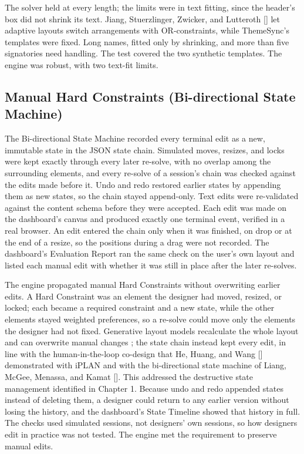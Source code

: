 \begin{refsection}
The solver held at every length; the limits were in text fitting, since the header's box did not shrink its text. Jiang, Stuerzlinger, Zwicker, and Lutteroth [\citeyear{Jiang2020ORCSolver}] let adaptive layouts switch arrangements with OR-constraints, while ThemeSync's templates were fixed. Long names, fitted only by shrinking, and more than five signatories need handling. The test covered the two synthetic templates. The engine was robust, with two text-fit limits.

\clearpage
\subsection{Manual Hard Constraints (Bi-directional State Machine)}

The Bi-directional State Machine recorded every terminal edit as a new, immutable state in the JSON state chain. Simulated moves, resizes, and locks were kept exactly through every later re-solve, with no overlap among the surrounding elements, and every re-solve of a session's chain was checked against the edits made before it. Undo and redo restored earlier states by appending them as new states, so the chain stayed append-only. Text edits were re-validated against the content schema before they were accepted. Each edit was made on the dashboard's canvas and produced exactly one terminal event, verified in a real browser. An edit entered the chain only when it was finished, on drop or at the end of a resize, so the positions during a drag were not recorded. The dashboard's Evaluation Report ran the same check on the user's own layout and listed each manual edit with whether it was still in place after the later re-solves.

The engine propagated manual Hard Constraints without overwriting earlier edits. A Hard Constraint was an element the designer had moved, resized, or locked; each became a required constraint and a new state, while the other elements stayed weighted preferences, so a re-solve could move only the elements the designer had not fixed. Generative layout models recalculate the whole layout and can overwrite manual changes \cite{Shi2023Survey}; the state chain instead kept every edit, in line with the human-in-the-loop co-design that He, Huang, and Wang [\citeyear{He2022iPLAN}] demonstrated with iPLAN and with the bi-directional state machine of Liang, McGee, Menassa, and Kamat [\citeyear{Liang2020Bidirectional}]. This addressed the destructive state management identified in Chapter 1. Because undo and redo appended states instead of deleting them, a designer could return to any earlier version without losing the history, and the dashboard's State Timeline showed that history in full. The checks used simulated sessions, not designers' own sessions, so how designers edit in practice was not tested. The engine met the requirement to preserve manual edits.


\end{refsection}
